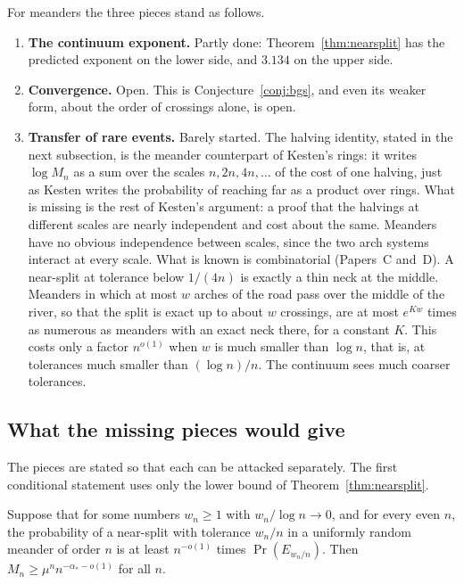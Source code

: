 For meanders the three pieces stand as follows.
\begin{enumerate}
\item \textbf{The continuum exponent.} Partly done: Theorem~\ref{thm:nearsplit} has the predicted
exponent on the lower side, and $3.134$ on the upper side.
\item \textbf{Convergence.} Open. This is Conjecture~\ref{conj:bgs}, and even its weaker form,
about the order of crossings alone, is open.
\item \textbf{Transfer of rare events.} Barely started. The halving identity, stated in
the next subsection, is the meander counterpart of Kesten's rings: it writes
$\log M_n$ as a sum over the scales $n,2n,4n,\ldots$ of the cost of one halving, just as Kesten
writes the probability of reaching far as a product over rings. What is missing is the rest of
Kesten's argument: a proof that the halvings at different scales are nearly independent and cost
about the same. Meanders have no obvious independence between scales, since the two arch systems
interact at every scale. What is known is combinatorial (Papers~C and~D). A near-split at
tolerance below $1/(4n)$ is exactly a thin neck at the middle. Meanders in which at most $w$ arches
of the road pass over the middle of the river, so that the split is exact up to about $w$
crossings, are at most $e^{Kw}$ times as numerous as meanders with an exact neck there, for a
constant $K$. This costs only a factor $n^{o(1)}$ when $w$ is much smaller than $\log n$, that is,
at tolerances much smaller than $(\log n)/n$. The continuum sees much coarser tolerances.
\end{enumerate}

\subsection{What the missing pieces would give}

The pieces are stated so that each can be attacked separately. The first conditional statement
uses only the lower bound of Theorem~\ref{thm:nearsplit}.

\begin{proposition}\label{prop:condlower}
Suppose that for some numbers $w_n\ge1$ with $w_n/\log n\to0$, and for every even $n$, the
probability of a near-split with tolerance $w_n/n$ in a uniformly random meander of order $n$ is at
least $n^{-o(1)}$ times $\Pr(E_{w_n/n})$. Then $M_n\ge \mu^n n^{-\alpha_*-o(1)}$ for all $n$.
\end{proposition}

